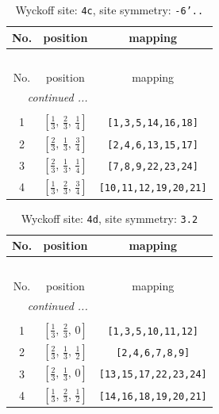 \documentclass[fleqn,8pt]{jsarticle}
\begin{document}
\renewcommand{\arraystretch}{1.2}
\begin{longtable}{ccc}
\caption{Wyckoff site: {\tt 4c}, site symmetry: {\tt -6'..}}
 \\
 \hline \hline
No. & position & mapping \\ \hline \endfirsthead

\multicolumn{2}{l}{\tablename\ \thetable{}} \\
 \hline \hline
No. & position & mapping \\ \hline \endhead

 \hline \hline
\multicolumn{2}{r}{\footnotesize\it continued ...} \\ \endfoot

 \hline \hline
\multicolumn{2}{r}{} \\ \endlastfoot

1 & $\left[ \frac{1}{3},\, \frac{2}{3},\, \frac{1}{4} \right]$ & {\tt [1,3,5,14,16,18]} \\ \hline
2 & $\left[ \frac{2}{3},\, \frac{1}{3},\, \frac{3}{4} \right]$ & {\tt [2,4,6,13,15,17]} \\ \hline
3 & $\left[ \frac{2}{3},\, \frac{1}{3},\, \frac{1}{4} \right]$ & {\tt [7,8,9,22,23,24]} \\ \hline
4 & $\left[ \frac{1}{3},\, \frac{2}{3},\, \frac{3}{4} \right]$ & {\tt [10,11,12,19,20,21]} \\
\end{longtable}
\renewcommand{\arraystretch}{1.2}
\begin{longtable}{ccc}
\caption{Wyckoff site: {\tt 4d}, site symmetry: {\tt 3.2}}
 \\
 \hline \hline
No. & position & mapping \\ \hline \endfirsthead

\multicolumn{2}{l}{\tablename\ \thetable{}} \\
 \hline \hline
No. & position & mapping \\ \hline \endhead

 \hline \hline
\multicolumn{2}{r}{\footnotesize\it continued ...} \\ \endfoot

 \hline \hline
\multicolumn{2}{r}{} \\ \endlastfoot

1 & $\left[ \frac{1}{3},\, \frac{2}{3},\, 0 \right]$ & {\tt [1,3,5,10,11,12]} \\ \hline
2 & $\left[ \frac{2}{3},\, \frac{1}{3},\, \frac{1}{2} \right]$ & {\tt [2,4,6,7,8,9]} \\ \hline
3 & $\left[ \frac{2}{3},\, \frac{1}{3},\, 0 \right]$ & {\tt [13,15,17,22,23,24]} \\ \hline
4 & $\left[ \frac{1}{3},\, \frac{2}{3},\, \frac{1}{2} \right]$ & {\tt [14,16,18,19,20,21]} \\
\end{longtable}
\end{document}
